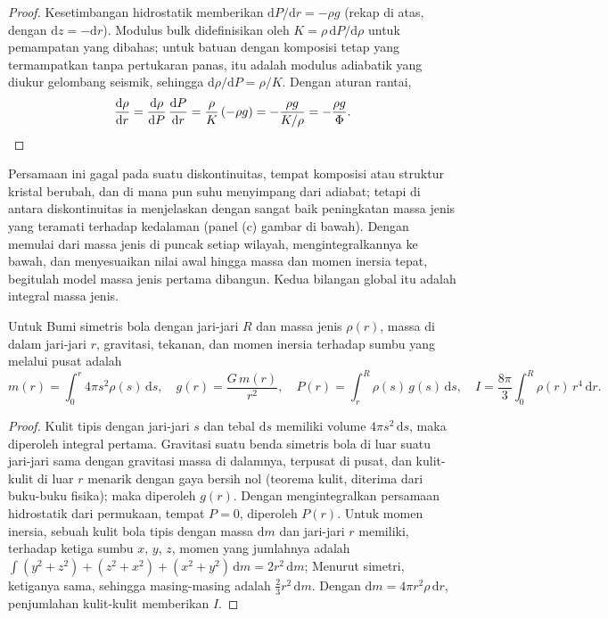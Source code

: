 \begin{proof}
Kesetimbangan hidrostatik memberikan $\mathrm dP/\mathrm dr = -\rho g$ (rekap di atas, dengan $\mathrm dz = -\mathrm dr$). Modulus bulk didefinisikan oleh $K = \rho\,\mathrm dP/\mathrm d\rho$ untuk pemampatan yang dibahas; untuk batuan dengan komposisi tetap yang termampatkan tanpa pertukaran panas, itu adalah modulus adiabatik yang diukur gelombang seismik, sehingga $\mathrm d\rho/\mathrm dP = \rho/K$. Dengan aturan rantai,
\[
  \frac{\mathrm d\rho}{\mathrm dr} = \frac{\mathrm d\rho}{\mathrm dP}\,
  \frac{\mathrm dP}{\mathrm dr} = \frac{\rho}{K}\,(-\rho g) = -\frac{\rho g}{K/\rho}
  = -\frac{\rho g}{\Phi}. \qedhere
\]
\end{proof}

Persamaan ini gagal pada suatu diskontinuitas, tempat komposisi atau struktur kristal berubah, dan di mana pun suhu menyimpang dari adiabat; tetapi di antara diskontinuitas ia menjelaskan dengan sangat baik peningkatan massa jenis yang teramati terhadap kedalaman (panel (c) gambar di bawah). Dengan memulai dari massa jenis di puncak setiap wilayah, mengintegralkannya ke bawah, dan menyesuaikan nilai awal hingga massa dan momen inersia tepat, begitulah model massa jenis pertama dibangun. Kedua bilangan global itu adalah integral massa jenis.

\begin{proposition}
\label{prop:b1:layered-earth:integrals}
Untuk Bumi simetris bola dengan jari-jari $R$ dan massa jenis $\rho(r)$, massa di dalam jari-jari $r$, gravitasi, tekanan, dan momen inersia terhadap sumbu yang melalui pusat adalah
\[
  m(r) = \int_0^r 4\pi s^2\rho(s)\,\mathrm ds, \quad
  g(r) = \frac{G\,m(r)}{r^2}, \quad
  P(r) = \int_r^R \rho(s)\,g(s)\,\mathrm ds, \quad
  I = \frac{8\pi}{3}\int_0^R \rho(r)\,r^4\,\mathrm dr.
\]
\end{proposition}

\begin{proof}
Kulit tipis dengan jari-jari $s$ dan tebal $\mathrm ds$ memiliki volume $4\pi s^2\,\mathrm ds$, maka diperoleh integral pertama. Gravitasi suatu benda simetris bola di luar suatu jari-jari sama dengan gravitasi massa di dalamnya, terpusat di pusat, dan kulit-kulit di luar $r$ menarik dengan gaya bersih nol (teorema kulit, diterima dari buku-buku fisika); maka diperoleh $g(r)$. Dengan mengintegralkan persamaan hidrostatik dari permukaan, tempat $P = 0$, diperoleh $P(r)$. Untuk momen inersia, sebuah kulit bola tipis dengan massa $\mathrm dm$ dan jari-jari $r$ memiliki, terhadap ketiga sumbu $x$, $y$, $z$, momen yang jumlahnya adalah
$\int (y^2 + z^2) + (z^2 + x^2) + (x^2 + y^2)\,\mathrm dm = 2r^2\,\mathrm dm$;
Menurut simetri, ketiganya sama, sehingga masing-masing adalah $\tfrac23 r^2\,\mathrm dm$. Dengan $\mathrm dm = 4\pi r^2\rho\,\mathrm dr$, penjumlahan kulit-kulit memberikan $I$.
\end{proof}

